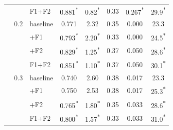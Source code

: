 \begin{tabular}{cclccccc}
 & & F1+F2 & 0.881\textsuperscript{*} & 0.82\textsuperscript{*} & 0.33 & 0.267\textsuperscript{*} & 29.9\textsuperscript{*} \\
\addlinespace[2pt]
0.1 & 0.2 & baseline & 0.771 & 2.32 & 0.35 & 0.000 & 23.3 \\
 & & +F1 & 0.793\textsuperscript{*} & 2.20\textsuperscript{*} & 0.33 & 0.000 & 24.5\textsuperscript{*} \\
 & & +F2 & 0.829\textsuperscript{*} & 1.25\textsuperscript{*} & 0.37 & 0.050 & 28.6\textsuperscript{*} \\
 & & F1+F2 & 0.851\textsuperscript{*} & 1.10\textsuperscript{*} & 0.37 & 0.050 & 30.1\textsuperscript{*} \\
\addlinespace[2pt]
0.1 & 0.3 & baseline & 0.740 & 2.60 & 0.38 & 0.017 & 23.3 \\
 & & +F1 & 0.750 & 2.53 & 0.38 & 0.017 & 25.3\textsuperscript{*} \\
 & & +F2 & 0.765\textsuperscript{*} & 1.80\textsuperscript{*} & 0.35 & 0.033 & 28.6\textsuperscript{*} \\
 & & F1+F2 & 0.800\textsuperscript{*} & 1.57\textsuperscript{*} & 0.33 & 0.033 & 31.0\textsuperscript{*} \\
\bottomrule
\end{tabular}

